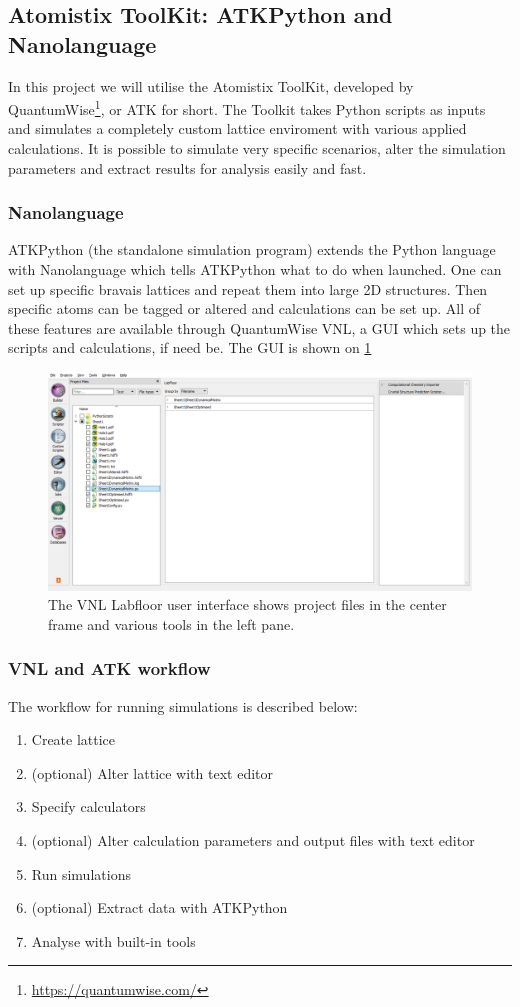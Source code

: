 
\subsection{Atomistix ToolKit: ATKPython and Nanolanguage}
In this project we will utilise the Atomistix ToolKit, developed by QuantumWise\footnote{\url{https://quantumwise.com/}}, or ATK for short. The Toolkit takes Python scripts as inputs and simulates a completely custom lattice enviroment with various applied calculations. It is possible to simulate very specific scenarios, alter the simulation parameters and extract results for analysis easily and fast.
\subsubsection{Nanolanguage}
ATKPython (the standalone simulation program) extends the Python language with Nanolanguage which tells ATKPython what to do when launched. One can set up specific bravais lattices and repeat them into large 2D structures. Then specific atoms can be tagged or altered and calculations can be set up. All of these features are available through QuantumWise VNL, a GUI which sets up the scripts and calculations, if need be. The GUI is shown on \cref{VNLLAB}
\begin{figure}
 \centering
 \includegraphics[width=\columnwidth]{Figures/VNLLabfloor.png}
 \caption{The VNL Labfloor user interface shows project files in the center frame and various tools in the left pane.}
 \label{VNLLAB}
\end{figure}
\subsubsection{VNL and ATK workflow}
The workflow for running simulations is described below:
\begin{enumerate}
 \item Create lattice
 \item (optional) Alter lattice with text editor
 \item Specify calculators
 \item (optional) Alter calculation parameters and output files with text editor
 \item Run simulations
 \item (optional) Extract data with ATKPython
 \item Analyse with built-in tools
\end{enumerate}
